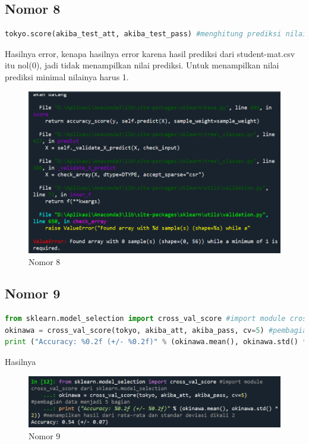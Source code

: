 \subsection{Nomor 8}

\begin{lstlisting}[language=Python]
tokyo.score(akiba_test_att, akiba_test_pass) #menghitung prediksi nilai yang akan datang
\end{lstlisting}

\par Hasilnya error, kenapa hasilnya error karena hasil prediksi dari student-mat.csv itu nol(0), jadi tidak menampilkan nilai prediksi. Untuk menampilkan nilai prediksi minimal nilainya harus 1.

\begin{figure}[H]
    \centering
    \includegraphics[width=12cm]{figures/chapter2/28.PNG}
    \caption{Nomor 8}
\end{figure}

\subsection{Nomor 9}

\begin{lstlisting}[language=Python]
from sklearn.model_selection import cross_val_score #import module cross_val_score dari sklearn.model_selection
okinawa = cross_val_score(tokyo, akiba_att, akiba_pass, cv=5) #pembagian data menjadi 5 bagian
print ("Accuracy: %0.2f (+/- %0.2f)" % (okinawa.mean(), okinawa.std() * 2)) #menampilkan hasil dari rata-rata dan standar deviasi dikali 2
\end{lstlisting}

\par Hasilnya

\begin{figure}[H]
    \centering
    \includegraphics[width=12cm]{figures/chapter2/29.PNG}
    \caption{Nomor 9}
\end{figure}

